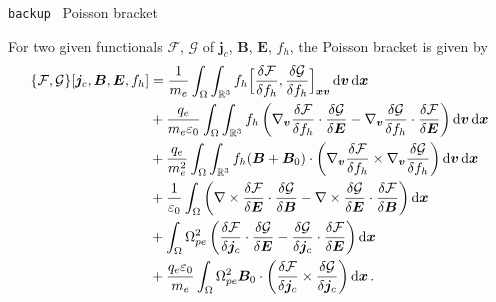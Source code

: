 \documentclass{beamer}
\newcommand{\Mvb}[1]{\boldsymbol{#1}}
\newenvironment{bframe}[1]%
{%
  \begin{frame}{{\small\texttt{backup}\ } #1}
}%
{%
  \end{frame}
}
\begin{document}
\begin{bframe}{Poisson bracket}
  For two given functionals  $\mathcal{F}$, $\mathcal{G}$ of $\Mvb{j}_c$, $\Mvb{B}$, $\Mvb{E}$, $f_h$, the Poisson bracket is given by 
  $$
    \begin{aligned}
      \{ {\cal F}, {\cal G} \}[\Mvb{j}_c, \Mvb{B}, \Mvb{E}, f_h] &=
          \frac{1}{m_e} \int_\Omega \int_{\mathbb{R}^3} f_h \Big[ \frac{\delta \mathcal{F}}{\delta f_h}, \frac{\delta \mathcal{G}}{\delta f_h} \Big]_{\Mvb{x}\Mvb{v}} \dd{\Mvb{v}}\dd{\Mvb{x}} \\
      & + \frac{q_e}{m_e\varepsilon_0} \int_\Omega \int_{\mathbb{R}^3} f_h \left( \nabla_{\Mvb{v}}\frac{\delta \mathcal{F}}{\delta f_h} \cdot \frac{\delta \mathcal{G}}{\delta\Mvb{E}} -  \nabla_{\Mvb{v}}\frac{\delta \mathcal{G}}{\delta f_h} \cdot \frac{\delta \mathcal{F}}{\delta\Mvb{E}} \right) \dd{\Mvb{v}}\dd{\Mvb{x}} \\
      & + \frac{q_e}{m^2_e} \int_\Omega \int_{\mathbb{R}^3} f_h (\Mvb{B} + \Mvb{B}_0) \cdot \left( \nabla_{\Mvb{v}}\frac{\delta \mathcal{F}}{\delta f_h} \times \nabla_{\Mvb{v}}\frac{\delta \mathcal{G}}{\delta f_h} \right) \dd{\Mvb{v}}\dd{\Mvb{x}} \\
      & + \frac{1}{\varepsilon_0} \int_\Omega  \left( \nabla \times \frac{\delta \mathcal{F}}{\delta \Mvb{E}} \cdot  \frac{\delta \mathcal{G}}{\delta \Mvb{B}} - \nabla \times \frac{\delta \mathcal{G}}{\delta \Mvb{E}} \cdot  \frac{\delta \mathcal{F}}{\delta \Mvb{B}} \right) \dd{\Mvb{x}} \\
      & +  \int_\Omega \Omega_{pe}^2 \left( \frac{\delta \mathcal{F}}{\delta \Mvb{j}_c} \cdot \frac{\delta \mathcal{G}}{\delta \Mvb{E}} -  \frac{\delta \mathcal{G}}{\delta \Mvb{j}_c} \cdot \frac{\delta \mathcal{F}}{\delta \Mvb{E}} \right)  \dd{\Mvb{x}} \\
      & + \frac{q_e \varepsilon_0}{m_e}  \int_\Omega   \Omega_{pe}^2 \Mvb{B}_0 \cdot \left( \frac{\delta \mathcal{F}}{\delta \Mvb{j}_c} \times \frac{\delta \mathcal{G}}{\delta \Mvb{j}_c} \right) \dd{\Mvb{x}}.
    \end{aligned}
  $$
\end{bframe}
\end{document}
